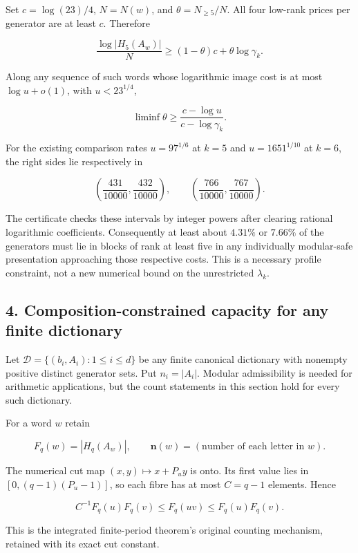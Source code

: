 Set \(c=\log(23)/4\), \(N=N(w)\), and \(\theta=N_{\ge5}/N\). All four low-rank prices per generator are at least \(c\). Therefore

\[
\boxed{
\frac{\log |H_5(A_w)|}{N}
\ge(1-\theta)c+\theta\log\gamma_k.
}
\tag{3.6}
\]

Along any sequence of such words whose logarithmic image cost is at most \(\log u+o(1)\), with \(u<23^{1/4}\),

\[
\liminf\theta\ge
\frac{c-\log u}{c-\log\gamma_k}.
\tag{3.7}
\]

For the existing comparison rates \(u=97^{1/6}\) at \(k=5\) and \(u=1651^{1/10}\) at \(k=6\), the right sides lie respectively in

\[
\left(\frac{431}{10000},\frac{432}{10000}\right),
\qquad
\left(\frac{766}{10000},\frac{767}{10000}\right).
\tag{3.8}
\]

The certificate checks these intervals by integer powers after clearing rational logarithmic coefficients. Consequently at least about \(4.31\%\) or \(7.66\%\) of the generators must lie in blocks of rank at least five in any individually modular-safe presentation approaching those respective costs. This is a necessary profile constraint, not a new numerical bound on the unrestricted \(\lambda_k\).

\subsection{4. Composition-constrained capacity for any finite dictionary}\label{composition-constrained-capacity-for-any-finite-dictionary}

Let \(\mathcal D=\{(b_i,A_i):1\le i\le d\}\) be any finite canonical dictionary with nonempty positive distinct generator sets. Put \(n_i=|A_i|\). Modular admissibility is needed for arithmetic applications, but the count statements in this section hold for every such dictionary.

For a word \(w\) retain

\[
F_q(w)=|H_q(A_w)|,
\qquad \mathbf n(w)=(\text{number of each letter in }w).
\]

The numerical cut map \((x,y)\mapsto x+P_uy\) is onto. Its first value lies in \([0,(q-1)(P_u-1)]\), so each fibre has at most \(C=q-1\) elements. Hence

\[
\boxed{C^{-1}F_q(u)F_q(v)\le F_q(uv)\le F_q(u)F_q(v).}
\tag{4.1}
\]

This is the integrated finite-period theorem's original counting mechanism, retained with its exact cut constant.

